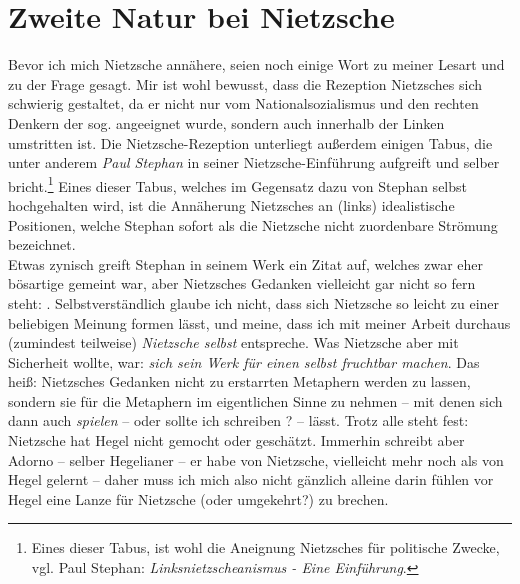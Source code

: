 \documentclass[12pt, a4paper, openany]{report}
\begin{document}
\section{Zweite Natur bei Nietzsche}\label{abschnitt_2}
Bevor ich mich Nietzsche annähere, seien noch einige Wort zu meiner Lesart und zu der Frage  gesagt.
Mir ist wohl bewusst, dass die Rezeption Nietzsches sich schwierig gestaltet, da er nicht nur vom Nationalsozialismus und den rechten Denkern der sog.  angeeignet wurde, sondern auch innerhalb der Linken umstritten ist.
Die Nietzsche-Rezeption unterliegt außerdem einigen Tabus, die unter anderem \emph{Paul Stephan} in seiner Nietzsche-Einführung aufgreift und selber bricht.\footnote{Eines dieser Tabus, ist wohl die Aneignung Nietzsches für politische Zwecke, vgl. Paul Stephan: \emph{Linksnietzscheanismus - Eine Einführung}.}
Eines dieser Tabus, welches im Gegensatz dazu von Stephan selbst hochgehalten wird, ist die Annäherung Nietzsches an (links) idealistische Positionen, welche Stephan sofort als die Nietzsche nicht zuordenbare Strömung bezeichnet. \\
Etwas zynisch greift Stephan in seinem Werk ein Zitat auf, welches zwar eher bösartige gemeint war, aber Nietzsches Gedanken vielleicht gar nicht so fern steht: .
Selbstverständlich glaube ich nicht, dass sich Nietzsche so leicht zu einer beliebigen Meinung formen lässt, und meine, dass ich mit meiner Arbeit durchaus (zumindest teilweise) \emph{Nietzsche selbst} entspreche. 
Was Nietzsche aber mit Sicherheit wollte, war: \emph{sich sein Werk für einen selbst fruchtbar machen}. 
Das heiß: Nietzsches Gedanken nicht zu erstarrten Metaphern werden zu lassen, sondern sie für die Metaphern im eigentlichen Sinne zu nehmen -- mit denen sich dann auch \emph{spielen} -- oder sollte ich schreiben ? -- lässt.
Trotz alle steht fest: Nietzsche hat Hegel nicht gemocht oder geschätzt.
Immerhin schreibt aber Adorno -- selber Hegelianer -- er habe von Nietzsche, vielleicht mehr noch als von Hegel gelernt -- daher muss ich mich also nicht gänzlich alleine darin fühlen vor Hegel eine Lanze für Nietzsche (oder umgekehrt?) zu brechen.\\
\end{document}

